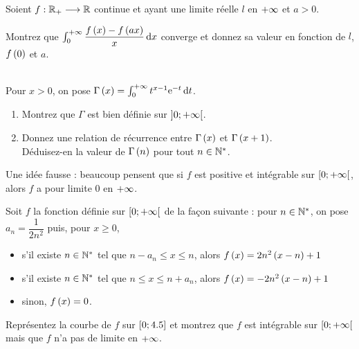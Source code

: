 \begin{exoss}
Soient \(f:\mathbb{R}_+\longrightarrow\mathbb{R}\) continue et ayant une limite réelle \(l\) en \(+\infty\) et \(a>0\).

Montrez que \(\int_0^{\pinf}\dfrac{f\paren{x}-f\paren{ax}}{x}\odif{x}\) converge et donnez sa valeur en fonction de \(l\), \(f\left(0\right)\) et \(a\).
\end{exoss}

\begin{exoss}~\\
Pour \(x>0\), on pose \(\Gamma\paren{x}=\int_0^{\pinf}t^{x-1}\e{-t}\odif{t}\).

\begin{enumerate}
    \item Montrez que \(\Gamma\) est bien définie sur \(\left]0;+\infty\right[\). \\
    \item Donnez une relation de récurrence entre \(\Gamma\left(x\right)\) et \(\Gamma\left(x+1\right)\). \\ Déduisez-en la valeur de \(\Gamma\left(n\right)\) pour tout \(n\in\mathbb{N}^*\).
\end{enumerate}
\end{exoss}

\begin{exoss}
Une idée fausse : beaucoup pensent que si \(f\) est positive et intégrable sur \(\left[0;+\infty\right[\), alors \(f\) a pour limite \(0\) en \(+\infty\).

Soit \(f\) la fonction définie sur \(\left[0;+\infty\right[\) de la façon suivante : pour \(n\in\mathbb{N}^*\), on pose \(a_n=\dfrac{1}{2n^2}\) puis, pour \(x\geq0\), \begin{itemize}
    \item s'il existe \(n\in\mathbb{N}^*\) tel que \(n-a_n\leq x\leq n\), alors \(f\left(x\right)=2n^2\left(x-n\right)+1\)
    \item s'il existe \(n\in\mathbb{N}^*\) tel que \(n\leq x\leq n+a_n\), alors \(f\left(x\right)=-2n^2\left(x-n\right)+1\)
    \item sinon, \(f\left(x\right)=0\).
\end{itemize}

Représentez la courbe de \(f\) sur \(\left[0;\num{4.5}\right]\) et montrez que \(f\) est intégrable sur \(\left[0;+\infty\right[\) mais que \(f\) n'a pas de limite en \(+\infty\).
\end{exoss}

